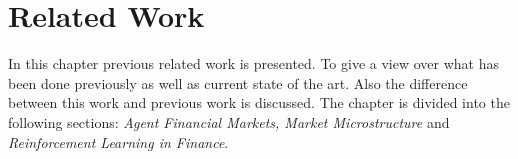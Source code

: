 \documentclass{kththesis}
\theoremstyle{definition}
\begin{document}



\chapter{Related Work}\label{ch:3}
In this chapter previous related work is presented. To give a view over what has been done previously as well as current state of the art. Also the difference between this work and previous work is discussed. The chapter is divided into the following sections: \textit{Agent Financial Markets, Market Microstructure} and \textit{Reinforcement Learning in Finance}.
\end{document}
